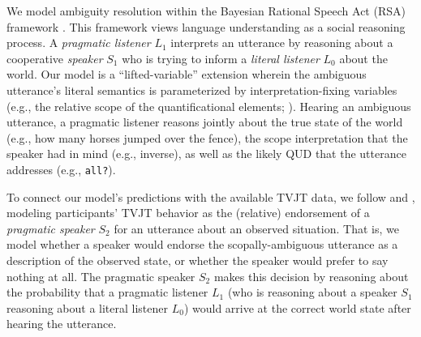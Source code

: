 \documentclass[10pt,a4paper]{article}
\newcommand{\gcs}[1]{\textcolor{blue}{[gcs: #1]}}
\newcommand{\lsp}[1]{\textcolor{violet}{[lsp: #1]}}
\begin{document}
We model  ambiguity resolution within the Bayesian Rational Speech Act (RSA) framework \cite{goodman2013knowledge}. This framework views language understanding as a social reasoning process. A \textit{pragmatic listener} $L_1$ interprets an utterance by reasoning about a cooperative \textit{speaker} $S_1$ who is trying to inform a \textit{literal listener} $L_0$ about the world.
Our model is a ``lifted-variable'' extension wherein the ambiguous utterance's literal semantics is parameterized by interpretation-fixing variables (e.g., the relative scope of the quantificational elements; ). Hearing an ambiguous utterance, a pragmatic listener reasons jointly about the true state of the world (e.g., how many horses jumped over the fence), the scope interpretation that the speaker had in mind (e.g., inverse), as well as the likely QUD that the utterance addresses (e.g., \texttt{all?}).  %

To connect our model's predictions with the available TVJT data, we follow  and , modeling participants' TVJT behavior as the (relative) endorsement of  a \textit{pragmatic speaker} $S_2$ for an utterance about an observed situation. That is, we model whether a speaker would endorse the scopally-ambiguous utterance as a description of the observed state, or whether the speaker would prefer to say nothing at all.  
The pragmatic speaker $S_2$ makes this decision by reasoning about the probability that a pragmatic listener $L_1$ (who is reasoning about a speaker $S_1$ reasoning about a literal listener $L_0$) would arrive at the correct world state after hearing the utterance. 
\end{document}
